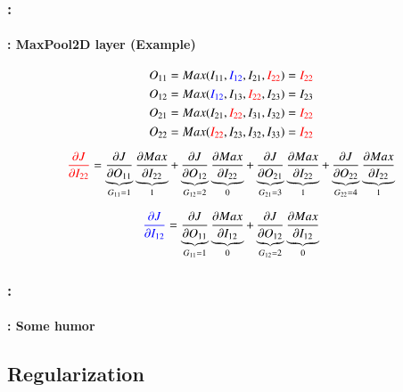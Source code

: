 \documentclass[xcolor=table]{beamer}
\begin{document}
\begin{frame}
	\frametitle{\insertshortsubtitle: \insertsection}
	\framesubtitle{\insertsubsection: MaxPool2D layer (Example)}
	
	
	\begin{center}
		\vskip-6pt
	\end{center}\vskip-16pt
	
	{\scriptsize 
		\[O_{11} = Max(I_{11}, \textcolor{blue}{I_{12}}, I_{21}, \textcolor{red}{I_{22}}) = \textcolor{red}{I_{22}}  \]
		\[O_{12} = Max(\textcolor{blue}{I_{12}}, I_{13}, \textcolor{red}{I_{22}}, I_{23}) = I_{23}  \]
		\[O_{21} = Max(I_{21}, \textcolor{red}{I_{22}}, I_{31}, I_{32}) = \textcolor{red}{I_{22}} \]
		\[O_{22} = Max(\textcolor{red}{I_{22}}, I_{23}, I_{32}, I_{33}) = \textcolor{red}{I_{22}}  \]
		
		\[\textcolor{red}{\frac{\partial J}{\partial I_{22}}} 
		= \underbrace{\frac{\partial J}{\partial O_{11}}}_{G_{11} = 1} 
		\underbrace{\frac{\partial Max}{\partial I_{22}}}_{1}
		+ \underbrace{\frac{\partial J}{\partial O_{12}}}_{G_{12} = 2} 
		\underbrace{\frac{\partial Max}{\partial I_{22}}}_{0}
		+ \underbrace{\frac{\partial J}{\partial O_{21}}}_{G_{21} = 3} 
		\underbrace{\frac{\partial Max}{\partial I_{22}}}_{1}
		+ \underbrace{\frac{\partial J}{\partial O_{22}}}_{G_{22} = 4} 
		\underbrace{\frac{\partial Max}{\partial I_{22}}}_{1}\]
		
		\[\textcolor{blue}{\frac{\partial J}{\partial I_{12}}} 
		= \underbrace{\frac{\partial J}{\partial O_{11}}}_{G_{11} = 1} 
		\underbrace{\frac{\partial Max}{\partial I_{12}}}_{0}
		+ \underbrace{\frac{\partial J}{\partial O_{12}}}_{G_{12} = 2} 
		\underbrace{\frac{\partial Max}{\partial I_{12}}}_{0}\]
	}
	
\end{frame}

\begin{frame}
	\frametitle{\insertshortsubtitle: \insertsection}
	\framesubtitle{\insertsubsection: Some humor}

	\begin{center}
	\end{center}

\end{frame}

\subsection{Regularization}
\end{document}
